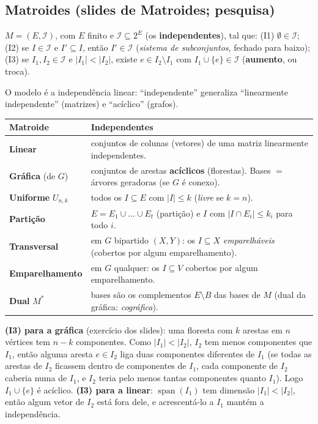 \subsection{Matroides (slides de Matroides; pesquisa)}\label{sec:matroides}
\begin{defi}
$M=(E,\mathcal I)$, com $E$ finito e $\mathcal I\subseteq2^E$ (os \textbf{independentes}), tal que:
(I1) $\emptyset\in\mathcal I$;\quad
(I2) se $I\in\mathcal I$ e $I'\subseteq I$, então $I'\in\mathcal I$ (\emph{sistema de subconjuntos}, fechado para baixo);\quad
(I3) se $I_1,I_2\in\mathcal I$ e $|I_1|<|I_2|$, existe $e\in I_2\setminus I_1$ com $I_1\cup\{e\}\in\mathcal I$ (\textbf{aumento}, ou troca).
\end{defi}
O modelo é a independência linear: ``independente'' generaliza ``linearmente independente'' (matrizes) e ``acíclico'' (grafos).
\begin{center}\small
\begin{tabularx}{\linewidth}{@{}lX@{}}
\toprule
Matroide & Independentes\\
\midrule
\textbf{Linear} & conjuntos de colunas (vetores) de uma matriz linearmente independentes.\\
\textbf{Gráfica} (de $G$) & conjuntos de arestas \textbf{acíclicos} (florestas). Bases $=$ árvores geradoras (se $G$ é conexo).\\
\textbf{Uniforme} $U_{n,k}$ & todos os $I\subseteq E$ com $|I|\le k$ (\emph{livre} se $k=n$).\\
\textbf{Partição} & $E=E_1\cup\dots\cup E_t$ (partição) e $I$ com $|I\cap E_i|\le k_i$ para todo $i$.\\
\textbf{Transversal} & em $G$ bipartido $(X,Y)$: os $I\subseteq X$ \emph{emparelháveis} (cobertos por algum emparelhamento).\\
\textbf{Emparelhamento} & em $G$ qualquer: os $I\subseteq V$ cobertos por algum emparelhamento.\\
\textbf{Dual} $M^*$ & bases são os complementos $E\setminus B$ das bases de $M$ (dual da gráfica: \emph{cográfica}).\\
\bottomrule
\end{tabularx}
\end{center}
\textbf{(I3) para a gráfica} (exercício dos slides): uma floresta com $k$ arestas em $n$ vértices tem $n-k$ componentes. Como $|I_1|<|I_2|$, $I_2$ tem menos componentes que $I_1$, então alguma aresta $e\in I_2$ liga duas componentes diferentes de $I_1$ (se todas as arestas de $I_2$ ficassem dentro de componentes de $I_1$, cada componente de $I_2$ caberia numa de $I_1$, e $I_2$ teria pelo menos tantas componentes quanto $I_1$). Logo $I_1\cup\{e\}$ é acíclico.
\textbf{(I3) para a linear}: $\operatorname{span}(I_1)$ tem dimensão $|I_1|<|I_2|$, então algum vetor de $I_2$ está fora dele, e acrescentá-lo a $I_1$ mantém a independência.

